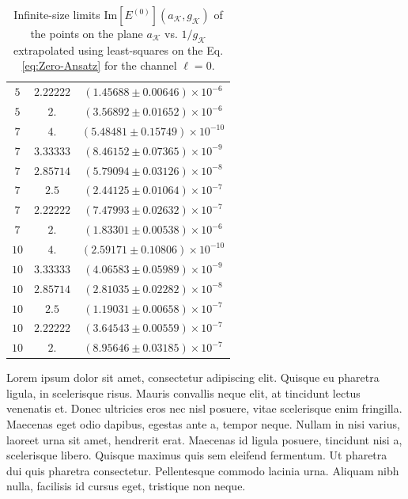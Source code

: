 \documentclass[english,aps,prd,nofootinbib,twocolumn]{revtex4-1}
\begin{document}
\begin{table}
\begin{tabular}{ccc}
$ 5 $ & $ 2.22222 $ & $ (1.45688\pm0.00646)\times 10^{-6}$ \\
$ 5 $ & $ 2.      $ & $ (3.56892\pm0.01652)\times 10^{-6}$ \\ \hline \hline 
$ 7 $ & $ 4.      $ & $ (5.48481\pm0.15749)\times 10^{-10}$ \\
$ 7 $ & $ 3.33333 $ & $ (8.46152\pm0.07365)\times 10^{-9}$ \\
$ 7 $ & $ 2.85714 $ & $ (5.79094\pm0.03126)\times 10^{-8}$ \\
$ 7 $ & $ 2.5     $ & $ (2.44125\pm0.01064)\times 10^{-7}$ \\
$ 7 $ & $ 2.22222 $ & $ (7.47993\pm0.02632)\times 10^{-7}$ \\
$ 7 $ & $ 2.      $ & $ (1.83301\pm0.00538)\times 10^{-6}$ \\ \hline \hline 
$10 $ & $ 4.      $ & $ (2.59171\pm0.10806)\times 10^{-10}$ \\
$10 $ & $ 3.33333 $ & $ (4.06583\pm0.05989)\times 10^{-9}$ \\
$10 $ & $ 2.85714 $ & $ (2.81035\pm0.02282)\times 10^{-8}$ \\
$10 $ & $ 2.5     $ & $ (1.19031\pm0.00658)\times 10^{-7}$ \\
$10 $ & $ 2.22222 $ & $ (3.64543\pm0.00559)\times 10^{-7}$ \\
$10 $ & $ 2.      $ & $ (8.95646\pm0.03185)\times 10^{-7}$ \\ \hline \hline  
\end{tabular}
\caption{Infinite-size limits $\mathrm{Im}[E^{(0)}](a_{\mathcal{K}},g_{\mathcal{K}})$ of the points on the plane $a_{\mathcal{K}}$ vs. $1/g_{\mathcal{K}}$ extrapolated using least-squares on the Eq. \eqref{eq:Zero-Ansatz} for the channel $\ell=0$.}
\label{tab:Inf-size-points-L0}
\end{table}

Lorem ipsum dolor sit amet, consectetur adipiscing elit. Quisque eu pharetra ligula, in scelerisque risus. Mauris convallis neque elit, at tincidunt lectus venenatis et. Donec ultricies eros nec nisl posuere, vitae scelerisque enim fringilla. Maecenas eget odio dapibus, egestas ante a, tempor neque. Nullam in nisi varius, laoreet urna sit amet, hendrerit erat. Maecenas id ligula posuere, tincidunt nisi a, scelerisque libero. Quisque maximus quis sem eleifend fermentum. Ut pharetra dui quis pharetra consectetur. Pellentesque commodo lacinia urna. Aliquam nibh nulla, facilisis id cursus eget, tristique non neque.
\end{document}
